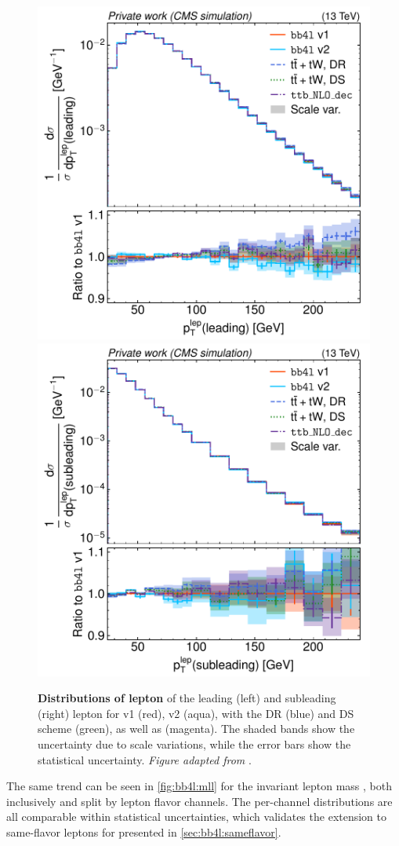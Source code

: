 \begin{figure}[tp]
    \centering
    \includegraphics[width=0.49 \textwidth]{figures/bb4l/generators/MC_TTBAR_DILEP_SPINDENSITY_lep_pt_1.pdf}
    \hfill
    \includegraphics[width=0.49 \textwidth]{figures/bb4l/generators/MC_TTBAR_DILEP_SPINDENSITY_lep_pt_2.pdf}
    \caption{\textbf{Distributions of lepton \pt} of the leading (left) and subleading
      (right) lepton for
      \bbfourl v1 (red), v2 (aqua), \tttWsum with the DR (blue) and DS scheme
      (green), as well as \ttb (magenta). The shaded bands show the
      uncertainty due to scale variations, while the error bars show
      the statistical uncertainty. \textit{Figure adapted from }.}
    \label{fig:bb4l:leppt}
\end{figure}

The same trend can be seen in \cref{fig:bb4l:mll} for the invariant lepton mass \mll, both inclusively and split by lepton flavor channels. The per-channel distributions are all comparable within statistical uncertainties, which validates the extension to same-flavor leptons for \bbfourl presented in \cref{sec:bb4l:sameflavor}.


